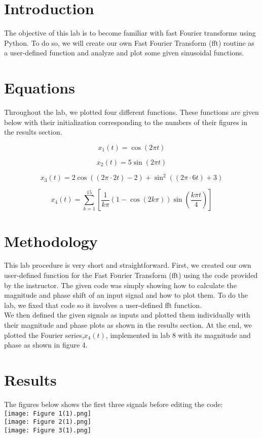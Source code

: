 \documentclass[12pt]{report}
\begin{document}
\section{Introduction}
The objective of this lab is to become familiar with fast Fourier transforms using Python. To do so, we will create our own Fast Fourier Transform (fft) routine as a user-defined function and analyze and plot some given sinusoidal functions.

\section{Equations}
Throughout the lab, we plotted four different functions. These functions are given below with their initialization corresponding to the numbers of their figures in the results section.

$$x_1(t) = \cos{(2\pi t)}$$

$$x_2(t) = 5\sin{(2\pi t)}$$

$$x_3(t) = 2\cos{((2\pi \cdot 2t)-2)} + \sin^2{((2\pi \cdot 6t)+3)}$$

$$x_4(t) = \sum_{k=1}^{15}[\frac{1}{k\pi}( 1-\cos{(2k\pi)}) \sin{(\frac{k\pi t}{4})}]$$

\section{Methodology}
This lab procedure is very short and straightforward. First, we created our own user-defined function for the Fast Fourier Transform (fft) using the code provided by the instructor. The given code was simply showing how to calculate the magnitude and phase shift of an input signal and how to plot them. To do the lab, we fixed that code so it involves a user-defined fft function.\\
We then defined the given signals as inputs and plotted them individually with their magnitude and phase plots as shown in the results section. At the end, we plotted the Fourier series,$x_4(t)$, implemented in lab 8 with its magnitude and phase as shown in figure 4.
   
\section{Results}
The figures below shows the first three signals before editing the code:\\
\texttt{[image: Figure 1(1).png]}\\
\texttt{[image: Figure 2(1).png]}\\
\texttt{[image: Figure 3(1).png]}\\
\end{document}
